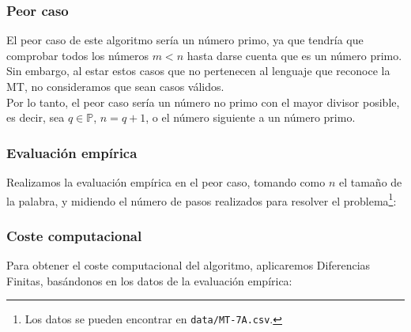 

\subsubsection*{Peor caso}
El peor caso de este algoritmo sería un número primo, ya que tendría que comprobar todos los números $m < n$ hasta darse cuenta que es un número primo. Sin embargo, al estar estos casos que no pertenecen al lenguaje que reconoce la MT, no consideramos que sean casos válidos.\\
Por lo tanto, el peor caso sería un número no primo con el mayor divisor posible, es decir, sea $q \in \mathbb{P}$, $n = q + 1$, o el número siguiente a un número primo.


\subsubsection*{Evaluación empírica}
Realizamos la evaluación empírica en el peor caso, tomando como $n$ el tamaño de la palabra, y midiendo el número de pasos realizados para resolver el problema\footnote{Los datos se pueden encontrar en \texttt{data/MT-7A.csv}.}:



\subsubsection*{Coste computacional}
Para obtener el coste computacional del algoritmo, aplicaremos Diferencias Finitas, basándonos en los datos de la evaluación empírica:


